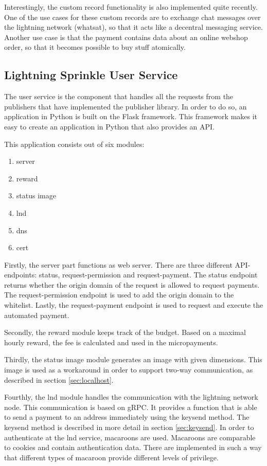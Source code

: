 Interestingly, the custom record functionality is also implemented quite recently. One of the use cases for these custom records are to exchange chat messages over the lightning network (whatsat), so that it acts like a decentral messaging service. Another use case is that the payment contains data about an online webshop order, so that it becomes possible to buy stuff atomically.


\subsection{Lightning Sprinkle User Service}

The user service is the component that handles all the requests from the publishers that have implemented the publisher library. In order to do so, an application in Python is built on the Flask framework. This framework makes it easy to create an application in Python that also provides an API.

This application consists out of six modules:
\begin{enumerate}
  \item server
  \item reward
  \item status image
  \item lnd
  \item dns
  \item cert 
\end{enumerate}

Firstly, the server part functions as web server. There are three different API-endpoints: status, request-permission and request-payment. The status endpoint returns whether the origin domain of the request is allowed to request payments. The request-permission endpoint is used to add the origin domain to the whitelist. Lastly, the request-payment endpoint is used to request and execute the automated payment.

Secondly, the reward module keeps track of the budget. Based on a maximal hourly reward, the fee is calculated and used in the micropayments.

Thirdly, the status image module generates an image with given dimensions. This image is used as a workaround in order to support two-way communication, as described in section \ref{sec:localhost}.

Fourthly, the lnd module handles the communication with the lightning network node. This communication is based on gRPC. It provides a function that is able to send a payment to an address immediately using the keysend method. The keysend method is described in more detail in section \ref{sec:keysend}. In order to authenticate at the lnd service, macaroons are used. Macaroons are comparable to cookies and contain authentication data. There are implemented in such a way that different types of macaroon provide different levels of privilege. 


